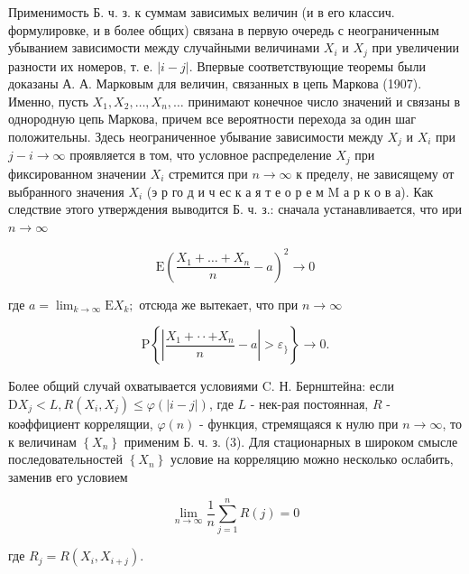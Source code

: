 \documentclass[10pt]{article}
\begin{document}
Применимость Б. ч. з. к суммам зависимых величин (и в его классич. формулировке, и в более общих) связана в первую очередь с неограниченным убыванием зависимости между случайными величинами $X_{i}$ и $X_{j}$ при увеличении разности их номеров, т. е. $|i-j|$. Впервые соответствующие теоремы были доказаны А. А. Марковым для величин, связанных в цепь Маркова (1907). Именно, пусть $X_{1}, X_{2}, \ldots, X_{n}, \ldots$ принимают конечное число значений и связаны в однородную цепь Маркова, причем все вероятности перехода за один шаг положительны. Здесь неограниченное убывание зависимости между $X_{j}$ и $X_{i}$ при $j-i \rightarrow \infty$ проявляется в том, что условное распределение $X_{j}$ при фиксированном значении $X_{i}$ стремится при $n \rightarrow \infty$ к пределу, не зависящему от выбранного значения $X_{i}$ (э р го д и ч ес к а я т е о р е м $\mathrm{M}$ а р к о в а). Как следствие этого утверждения выводится Б. ч. з.: сначала устанавливается, что ири $n \rightarrow \infty$



\[

\mathrm{E}\left(\frac{X_{1}+\ldots+X_{n}}{n}-a\right)^{2} \longrightarrow 0

\]



где $a=\lim _{k \rightarrow \infty} \mathrm{E} X_{k} ;$ отсюда же вытекает, что при $n \rightarrow \infty$



\[

\mathrm{P}\left\{\left|\frac{X_{1}+\cdot \cdot+X_{n}}{n}-a\right|>\varepsilon_{\}}\right\} \longrightarrow 0 .

\]



Более общий случай охватывается условиями C. Н. Бернштейна: если $\mathrm{D} X_{j}<L, R\left(X_{i}, X_{j}\right) \leqslant \varphi(|i-j|)$, где $L$ - нек-рая постоянная, $R$ - коәффициент коррелящии, $\varphi(n)$ - функция, стремящаяся к нулю при $n \rightarrow \infty$, то к величинам $\left\{X_{n}\right\}$ применим Б. ч. з. (3). Для стационарных в широком смысле последовательностей $\left\{X_{n}\right\}$ условие на корреляцию можно несколько ослабить, заменив его условием



\[

\lim _{n \rightarrow \infty} \frac{1}{n} \sum_{j=1}^{n} R(j)=0

\]



где $R_{j}=R\left(X_{i}, X_{i+j}\right)$.
\end{document}
